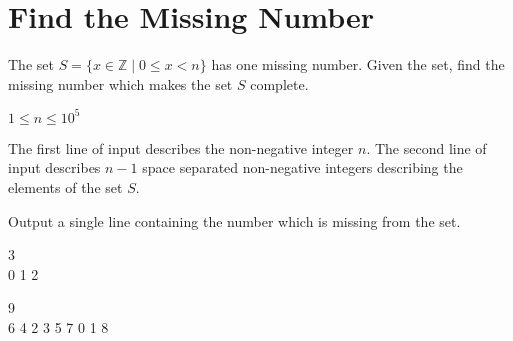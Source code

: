 

\newcommand{\problemsetTitle}{Warmup Problems}
\newcommand{\problemsetSubheader}{SLSS Computer Science Club}
\newcommand{\problemsetDate}{May 18, 2018}
\newcommand{\problemsetAuthor}{Shon Verch}



\makeHeader

\section{Find the Missing Number}
The set $S = \{x \in \mathbb{Z} \mid 0 \le x < n\}$ has one missing number. Given the set, find the missing number which makes the set $S$ complete.

\constraints
$1 \leq n \leq 10^5$

The first line of input describes the non-negative integer $n$. The second line of input describes $n-1$ space separated non-negative integers describing the elements of the set $S$.

\outputformat
Output a single line containing the number which is missing from the set.

\vspace{1em}

\addsample
{
3\\
0 1
}
{
2
}

\pushnewpage

\addsample
{
9\\
6 4 2 3 5 7 0 1
}
{
8
}
